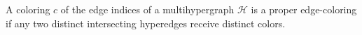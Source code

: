 \begin{definition}
A coloring $c$ of the edge indices of a multihypergraph $\mathcal H$ is a
proper edge-coloring if any two distinct intersecting hyperedges receive
distinct colors.
\end{definition}
